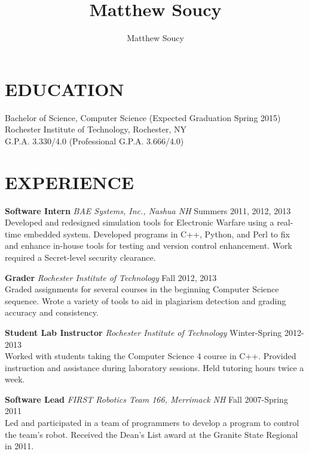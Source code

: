 \documentclass[line]{res}
\author{Matthew Soucy}
\title{Matthew Soucy}
\begin{document}
\setlength{\textheight}{11.5in} %
\address{\large 2433 Nathaniel Rochester Hall\\
		Rochester, NY 14623\\
		(585) 204-7402}

\begin{resume}

\section{EDUCATION}

	Bachelor of Science, Computer Science (Expected Graduation Spring 2015)\\
	Rochester Institute of Technology, Rochester, NY\\
	G.P.A. 3.330/4.0 (Professional G.P.A. 3.666/4.0)

\section{EXPERIENCE}

	\textbf{Software Intern}
	\textit{BAE Systems, Inc., Nashua NH}
	\hfill
	Summers 2011, 2012, 2013\\
	Developed and redesigned simulation tools for Electronic Warfare using a real-time embedded system.
	Developed programs in C++, Python, and Perl to fix and enhance in-house tools for testing and version control enhancement.
	Work required a Secret-level security clearance.

	\textbf{Grader}
	\textit{Rochester Institute of Technology}
	\hfill
	Fall 2012, 2013\\
	Graded assignments for several courses in the beginning Computer Science sequence.
	Wrote a variety of tools to aid in plagiarism detection and grading accuracy and consistency.

	\textbf{Student Lab Instructor}
	\textit{Rochester Institute of Technology}
	\hfill
	Winter-Spring 2012-2013\\
	Worked with students taking the Computer Science 4 course in C++.
	Provided instruction and assistance during laboratory sessions.
	Held tutoring hours twice a week.

	\textbf{Software Lead}
	\textit{FIRST Robotics Team 166, Merrimack NH}
	\hfill
	Fall 2007-Spring 2011\\
	Led and participated in a team of programmers to develop a program to control the team's robot.
	Received the Dean's List award at the Granite State Regional in 2011.


\end{resume}
\end{document}
